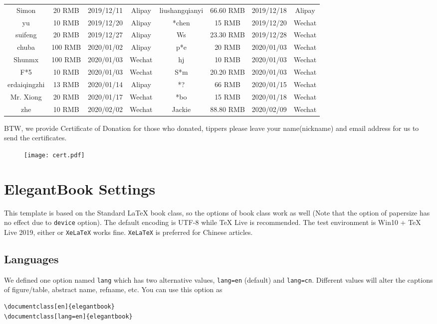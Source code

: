 \documentclass[11pt]{elegantbook}
\begin{document}
\begin{table}[!htb]
\begin{tabular}{*{4}{>{\scriptsize}c}|*{4}{>{\scriptsize}c}}
    Simon & 20 RMB & 2019/12/11 & Alipay   & liushangqianyi & 66.60 RMB & 2019/12/18 & Alipay \\
    yu     & 10 RMB & 2019/12/20 & Alipay   & *chen   & 15 RMB & 2019/12/20 & Wechat \\
    suifeng   & 20 RMB & 2019/12/27 & Alipay   & Ws    & 23.30 RMB & 2019/12/28 & Wechat \\
    chuba    & 100 RMB  & 2020/01/02 & Alipay   & p*e   & 20 RMB & 2020/01/03 & Wechat \\
    Shunmx & 100 RMB & 2020/01/03 & Wechat    & hj    & 10 RMB & 2020/01/03 & Wechat \\
    F*5   & 10 RMB & 2020/01/03 & Wechat    & S*m   & 20.20 RMB & 2020/01/03 & Wechat \\
    erdaiqingzhi  & 13 RMB & 2020/01/14 & Alipay   & *?    & 66 RMB & 2020/01/15 & Wechat \\
    Mr. Xiong & 20 RMB & 2020/01/17 & Wechat    & *bo    & 15 RMB & 2020/01/18 & Wechat \\
    *zhe    & 10 RMB & 2020/02/02 & Wechat    &  Jackie &  88.80 RMB  &  2020/02/09 & Wechat \\
    \bottomrule
  \end{tabular}%
  \label{tab:donation}%
\end{table}%

BTW, we provide Certificate of Donation for those who donated, tippers please leave your name(nickname) and email address for us to send the certificates.

\begin{figure}[!htb]
  \centering
  \texttt{[image: cert.pdf]}
\end{figure}

\chapter{ElegantBook Settings}

This template is based on the Standard \LaTeX{} book class, so the options of book class work as well (Note that the option of papersize has no effect due to \lstinline{device} option). The default encoding is UTF-8 while \TeX{} Live is recommended. The test environment is Win10 + \TeX{} Live 2019, either  or \lstinline{XeLaTeX} works fine. \lstinline{XeLaTeX} is preferred for Chinese articles.

\section{Languages}
We defined one option named \lstinline{lang} which has two alternative values, \lstinline{lang=en} (default) and \lstinline{lang=cn}. Different values will alter the captions of figure/table, abstract name, refname, etc. You can use this option as
\begin{lstlisting}
\documentclass[en]{elegantbook} 
\documentclass[lang=en]{elegantbook}
\end{lstlisting}
\end{document}

